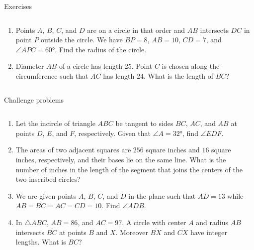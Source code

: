 \documentclass[9pt,aspectratio=169,handout]{beamer}
\begin{document}
\begin{frame}{Exercises}
\begin{columns}[T]
\begin{column}{0.5\textwidth}
\begin{enumerate}
        \item Points $A$, $B$, $C$, and $D$ are on a circle in that order and $AB$ intersects $DC$ in point $P$ outside the circle. We have $BP = 8$, $AB = 10$, $CD = 7$, and $\angle APC = 60°$. Find the radius of the circle.
        \item Diameter $AB$ of a circle has length $25$.  Point $C$ is chosen along the circumference such that $AC$ has length $24$.  What is the length of $BC$?     
      \end{enumerate}
    \end{column}
  \end{columns}
\end{frame}

\begin{frame}{Challenge problems}
  \begin{columns}[T]
    \begin{column}{0.5\textwidth}
      \begin{enumerate}
        \item Let the incircle of triangle $ABC$ be tangent to sides $BC$, $AC$, and $AB$ at points $D$, $E$, and $F$, respectively. Given that $\angle A = 32°$, find $\angle EDF$.
        \item The areas of two adjacent squares are $256$ square inches and $16$ square inches,
        respectively, and their bases lie on the same line. What is the number of inches in
        the length of the segment that joins the centers of the two inscribed circles? 
        \item We are given points $A$, $B$, $C$, and $D$ in the plane such that $AD = 13$ while $AB = BC = AC= CD = 10$. Find $\angle ADB$.
        \item In $\triangle ABC$, $AB = 86$, and $AC=97$. A circle with center $A$ and radius $AB$ intersects $\overline{BC}$ at points $B$ and $X$. Moreover $\overline{BX}$ and $\overline{CX}$ have integer lengths. What is $BC$?
      \end{enumerate}
    \end{column}
    \begin{column}{0.5\textwidth}
    \end{column}
  \end{columns}
\end{frame}
\end{document}
